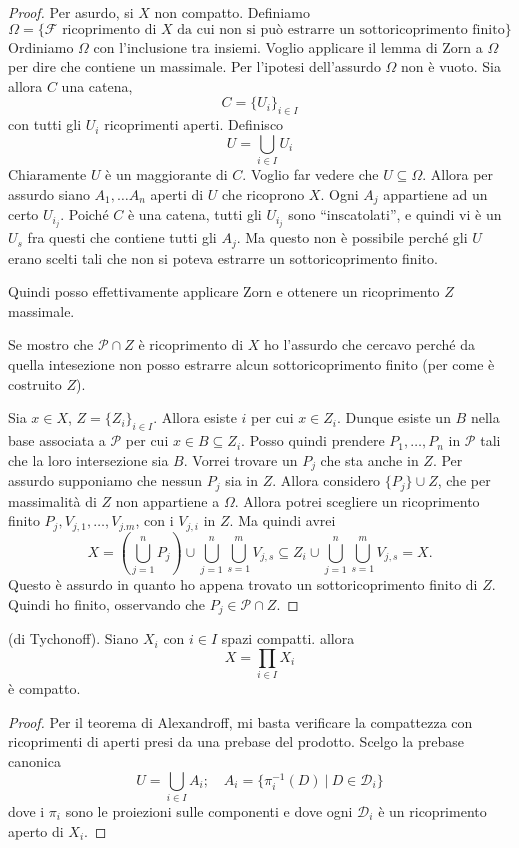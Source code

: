 \begin{proof}
    Per asurdo, si $X$ non compatto. Definiamo
    \[
        \Omega = \{\mathcal{F} \text{ ricoprimento di $X$ da cui non si pu\`o estrarre un sottoricoprimento finito}\}
    \]
    Ordiniamo $\Omega$ con l'inclusione tra insiemi. Voglio applicare il lemma di Zorn a $\Omega$ per dire che contiene un massimale. Per l'ipotesi dell'assurdo $\Omega$ non \`e vuoto. Sia allora $C$ una catena,
    \[
        C = \{U_i\}_{i\in I}
    \]
    con tutti gli $U_i$ ricoprimenti aperti. Definisco
    \[
        U = \bigcup_{i\in I}U_i
    \]
    Chiaramente $U$ \`e un maggiorante di $C$. Voglio far vedere che $U \subseteq\Omega$. Allora per assurdo siano $A_1, \dots A_n$ aperti di $U$  che ricoprono $X$. Ogni $A_j$ appartiene ad un certo $U_{i_j}$. Poich\'e $C$ \`e una catena, tutti gli $U_{i_j}$ sono ``inscatolati'', e quindi vi \`e un $U_s$ fra questi che contiene tutti gli $A_j$. Ma questo non \`e possibile perch\'e gli $U$ erano scelti tali che non si poteva estrarre un sottoricoprimento finito.

    Quindi posso effettivamente applicare Zorn e ottenere un ricoprimento $Z$ massimale.

    Se mostro che $\mathcal{P}\cap Z$ \`e ricoprimento di $X$ ho l'assurdo che cercavo perch\'e da quella intesezione non posso estrarre alcun sottoricoprimento finito (per come \`e costruito $Z$).

    Sia $x\in X$, $Z = \{Z_i\}_{i\in I}$. Allora esiste $i$ per cui $x\in Z_i$. Dunque esiste un $B$ nella base associata a $\mathcal{P}$ per cui $x\in B\subseteq Z_i$. Posso quindi prendere $P_1, \dots, P_n$ in $\mathcal{P}$ tali che la loro intersezione sia $B$. Vorrei trovare un $P_j$ che sta anche in $Z$. Per assurdo supponiamo che nessun $P_j$ sia in $Z$. Allora considero ${\{P_j \} \cup Z}$, che per massimalit\`a di $Z$ non appartiene a $\Omega$.
    Allora potrei scegliere un ricoprimento finito $P_j, V_{j,1}, \dots, V_{j.m}$, con i $V_{j,i}$ in $Z$. Ma quindi avrei
    \[
        X = \left(\bigcup_{j=1}^nP_j\right)\cup \bigcup_{j=1}^n\bigcup_{s=1}^m V_{j,s} \subseteq Z_i \cup \bigcup_{j=1}^n\bigcup_{s=1}^m V_{j,s} = X.
    \]
    Questo \`e assurdo in quanto ho appena trovato un sottoricoprimento finito di $Z$.
    Quindi ho finito, osservando che $P_j\in \mathcal{P}\cap Z$.
\end{proof}

\begin{thm}
    (di Tychonoff). Siano $X_i$ con $i\in I$ spazi compatti. allora
    \[
        X=\prod_{i\in I}X_i
    \]
    \`e compatto.
\end{thm}
\begin{proof}
    Per il teorema di Alexandroff, mi basta verificare la compattezza con ricoprimenti di aperti presi da una prebase del prodotto. Scelgo la prebase canonica
    \[
        U = \bigcup_{i\in I}A_i;\quad A_i = \{\pi_i^{-1}(D)\ | \ D \in \mathcal{D}_i\}
    \]
    dove i $\pi_i$ sono le proiezioni sulle componenti e dove ogni $\mathcal{D}_i$ \`e un ricoprimento aperto di $X_i$. 
\end{proof}
